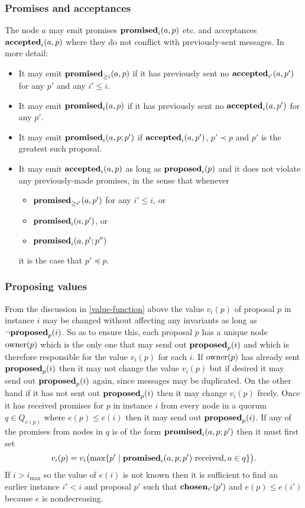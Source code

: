 \documentclass[journal]{IEEEtran}
\begin{document}
\subsubsection{Promises and acceptances} The node $a$ may emit promises
$\mathbf{promised}_{i}(a,p)$ etc. and acceptances $\mathbf{accepted}_{i}(a,p)$ where they do not
conflict with previously-sent messages. In more detail: \begin{itemize} \item
It may emit $\mathbf{promised}_{\ge i}(a,p)$ if it has previously sent no $\mathbf{accepted}_{i'}(a,p')$
for any $p'$ and any $i' \le i$. \item It may emit $\mathbf{promised}_{i}(a,p)$ if it has
previously sent no $\mathbf{accepted}_{i}(a,p')$ for any $p'$. \item It may emit
$\mathbf{promised}_{i}(a,p;p')$ if $\mathbf{accepted}_{i}(a,p')$, $p' \prec p$ and $p'$ is the
greatest such proposal. \item It may emit $\mathbf{accepted}_{i}(a,p)$ as long as
$\mathbf{proposed}_{i}(p)$ and it does not violate any previously-made promises, in the
sense that whenever \begin{itemize} \item $\mathbf{promised}_{\ge i'}(a,p')$ for any $i' \le
i$, or \item $\mathbf{promised}_{i}(a,p')$, or \item $\mathbf{promised}_{i}(a,p';p'')$\end{itemize}
it is the case that $p' \preceq p$. \end{itemize}

\subsubsection{Proposing values} From the discussion in \ref{value-function}
above the value $v_i(p)$ of proposal $p$ in instance $i$ may be changed without
affecting any invariants as long as $\neg\mathbf{proposed}_{p}(i)$. So as to ensure this,
each proposal $p$ has a unique node $\mathrm{owner}(p)$ which is the only one that may
send out $\mathbf{proposed}_{p}(i)$ and which is therefore responsible for the value
$v_i(p)$ for each $i$. If $\mathrm{owner}(p)$ has already sent $\mathbf{proposed}_{p}(i)$ then it
may not change the value $v_i(p)$ but if desired it may send out $\mathbf{proposed}_{p}(i)$
again, since messages may be duplicated. On the other hand if it has not sent
out $\mathbf{proposed}_{p}(i)$ then it may change $v_i(p)$ freely. Once it has received
promises for $p$ in instance $i$ from every node in a quorum $q \in Q_{e(p)}$
where $e(p) \le e(i)$ then it may send out $\mathbf{proposed}_{p}(i)$. If any of the
promises from nodes in $q$ is of the form $\mathbf{promised}_{i}(a,p;p')$ then it must
first set \[v_i(p) = v_i\bigl(\mathrm{max} \{p' \mid \mathbf{promised}_{i}(a,p;p')
\textrm{ received}, a \in q \}\bigr).\] If $i > i_\mathrm{max}$ so the value of
$e(i)$ is not known then it is sufficient to find an earlier instance $i' < i$
and proposal $p'$ such that $\mathbf{chosen}_{i'}(p')$ and $e(p) \le e(i')$ because $e$
is nondecreasing.
\end{document}
